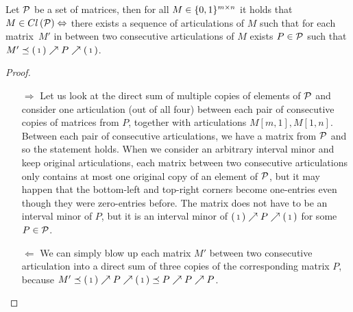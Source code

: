 \begin{lemma}
\label{lemma:artic}
Let $\mathcal{P}$ be a set of matrices, then for all $M\in\{0,1\}^{m\times n}$ it holds that $M\in Cl\left(\mathcal{P}\right)\Leftrightarrow$ there exists a sequence of articulations of $M$ such that for each matrix~$M'$ in between two consecutive articulations of $M$ exists $P\in\mathcal{P}$ such that $M'\preceq\left(\begin{smallmatrix}1\end{smallmatrix}\right)\nearrow P\nearrow\left(\begin{smallmatrix}1\end{smallmatrix}\right)$.
\end{lemma}
\begin{proof}
\begin{itemize}
	\item[$\Rightarrow$] Let us look at the direct sum of multiple copies of elements of $\mathcal{P}$ and consider one articulation (out of all four) between each pair of consecutive copies of matrices from $P$, together with articulations $M[m,1],M[1,n]$. Between each pair of consecutive articulations, we have a matrix from $\mathcal{P}$ and so the statement holds. When we consider an arbitrary interval minor and keep original articulations, each matrix between two consecutive articulations only contains at most one original copy of an element of $\mathcal{P}$, but it may happen that the bottom-left and top-right corners become one-entries even though they were zero-entries before. The matrix does not have to be an interval minor of $P$, but it is an interval minor of $\left(\begin{smallmatrix}1\end{smallmatrix}\right)\nearrow P\nearrow\left(\begin{smallmatrix}1\end{smallmatrix}\right)$ for some $P\in\mathcal{P}$.
	\item[$\Leftarrow$] We can simply blow up each matrix $M'$ between two consecutive articulation into a direct sum of three copies of  the corresponding matrix $P$, because $M'\preceq\left(\begin{smallmatrix}1\end{smallmatrix}\right)\nearrow P\nearrow\left(\begin{smallmatrix}1\end{smallmatrix}\right)\preceq P\nearrow P\nearrow P$.
\end{itemize}
\end{proof}

